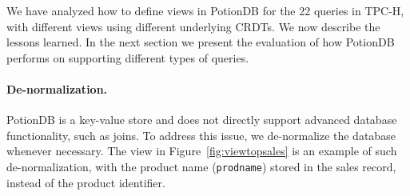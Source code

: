 \documentclass[sigplan,twocolumn,review,anonymous]{acmart}
\newcommand{\nuno}[1]{\nbnote{Nuno}{red}{#1}}
\begin{document}
%

We have analyzed how to define views in PotionDB for the 22 queries in TPC-H, with different views using different
underlying CRDTs.
We now describe the lessons learned. In the next section we present the evaluation of how PotionDB performs on supporting
 different types of queries.

\paragraph{De-normalization.} PotionDB is a key-value store and does not directly support advanced database functionality,
such as joins.  To address this issue, we de-normalize the database whenever necessary.  
The view in Figure~\ref{fig:viewtopsales} is an example of such de-normalization, with
the product name (\texttt{prodname}) stored in the sales record, instead of the product identifier.
\end{document}
